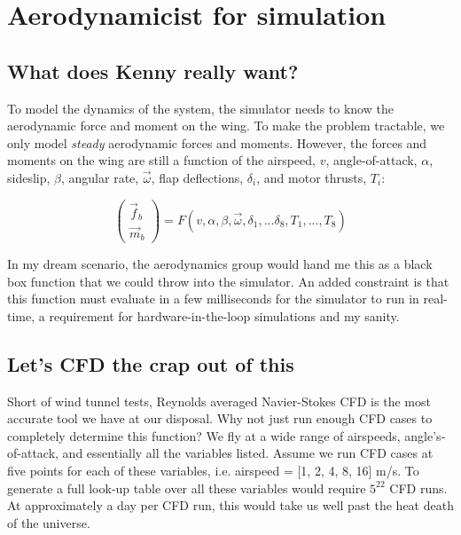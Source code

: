 \documentclass[11pt]{amsart}
\begin{document}
\section{Aerodynamicist for simulation}

\subsection{What does Kenny really want?}

To model the dynamics of the system, the simulator needs to know the
aerodynamic force and moment on the wing.  To make the problem
tractable, we only model {\it steady} aerodynamic forces and moments.
However, the forces and moments on the wing are still a function of
the airspeed, $v$, angle-of-attack, $\alpha$, sideslip, $\beta$,
angular rate, $\vec{\omega}$, flap deflections, $\delta_i$, and motor
thrusts, $T_i$:

\begin{equation}
\left(
\begin{array}{c}
\vec{f}_b \\
\vec{m}_b
\end{array}
\right) = F(v, \alpha, \beta, \vec{\omega}, \delta_1, ... \delta_8, T_1, ..., T_8)
\end{equation}

In my dream scenario, the aerodynamics group would hand me this as a
black box function that we could throw into the simulator.  An added
constraint is that this function must evaluate in a few milliseconds
for the simulator to run in real-time, a requirement for
hardware-in-the-loop simulations and my sanity.

\subsection{Let's CFD the crap out of this}

Short of wind tunnel tests, Reynolds averaged Navier-Stokes CFD is the
most accurate tool we have at our disposal.  Why not just run enough
CFD cases to completely determine this function?  We fly at a wide
range of airspeeds, angle's-of-attack, and essentially all the
variables listed.  Assume we run CFD cases at five points for each of
these variables, i.e. airspeed = [1, 2, 4, 8, 16] m/s.  To generate a
full look-up table over all these variables would require $5^{22}$ CFD
runs.  At approximately a day per CFD run, this would take us well
past the heat death of the universe.
\end{document}
